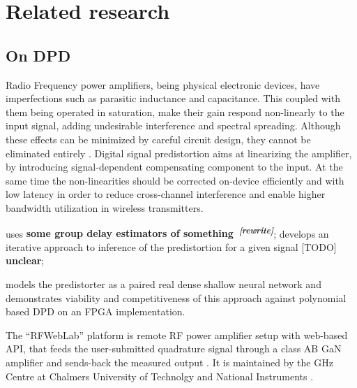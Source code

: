 \documentclass[a4paper,10pt]{article}
\newcommand{\important}[1]{\textbf{\color{red} #1}}
\newcommand{\attn}[2]{\textbf{\color{red} #2~\textsuperscript{\textit{[#1]}}}}
\newcommand{\rewrite}[1]{\attn{rewrite}{#1}}
\newcommand{\todo}[1]{{\color{blue} [TODO]} \important{#1}}
\begin{document}


\section{Related research} %
\label{sec:realted_research}

\subsection{On DPD} %
\label{sub:on_dpd}

Radio Frequency power amplifiers, being physical electronic devices, have imperfections such
as parasitic inductance and capacitance. This coupled with them being operated in saturation,
make their gain respond non-linearly to the input signal, adding undesirable interference and
spectral spreading. Although these effects can be minimized by careful circuit design, they
cannot be eliminated entirely \cite{citation_needed}. Digital signal predistortion aims at
linearizing the amplifier, by introducing signal-dependent compensating component to the input.
At the same time the non-linearities should be corrected on-device efficiently and with low
latency in order to reduce cross-channel interference and enable higher bandwidth utilization
in wireless transmitters.

\cite{traverso_low_2019} uses \rewrite{some group delay estimators of something};
\cite{schoukens_obtaining_2017} develops an iterative approach to inference of the predistortion for a given
signal \todo{unclear};

\cite{tarver_design_2019} models the predistorter as a paired real dense shallow neural network and
demonstrates viability and competitiveness of this approach against polynomial based DPD on an
FPGA implementation.

The ``RFWebLab'' platform is remote RF power amplifier setup with web-based API, that feeds
the user-submitted quadrature signal through a class AB GaN amplifier and sends-back the measured
output \cite{dpdcompetiton2018}. It is maintained by the GHz Centre at Chalmers University of
Technolgy and National Instruments \cite{landin_rfweblab_2015}.
\end{document}
